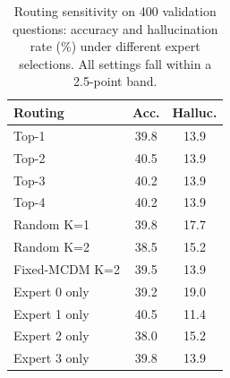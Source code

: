 \begin{table}[t]
\centering
\small
\begin{tabular}{lcc}
\toprule
Routing & Acc. & Halluc. \\
\midrule
Top-1 & 39.8 & 13.9 \\
Top-2 & 40.5 & 13.9 \\
Top-3 & 40.2 & 13.9 \\
Top-4 & 40.2 & 13.9 \\
Random K=1 & 39.8 & 17.7 \\
Random K=2 & 38.5 & 15.2 \\
Fixed-MCDM K=2 & 39.5 & 13.9 \\
Expert 0 only & 39.2 & 19.0 \\
Expert 1 only & 40.5 & 11.4 \\
Expert 2 only & 38.0 & 15.2 \\
Expert 3 only & 39.8 & 13.9 \\
\bottomrule
\end{tabular}
\caption{Routing sensitivity on 400 validation questions: accuracy and hallucination rate (\%) under different expert selections. All settings fall within a 2.5-point band.}
\label{tab:sens}
\end{table}
